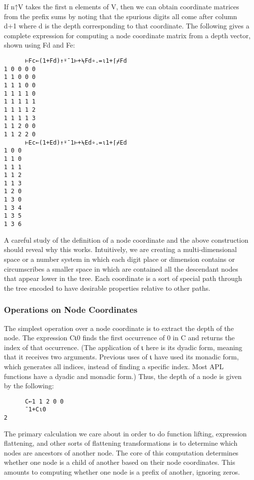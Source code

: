 \documentclass[pldi]{sigplanconf-pldi15}
\begin{document}
If n↑V takes the first n elements of V, then we can obtain coordinate matrices from the 
prefix sums by noting that the spurious digits all come after column d+1 where d is the 
depth corresponding to that coordinate. The following gives a complete expression for 
computing a node coordinate matrix from a depth vector, shown using Fd and Fe:

\begin{verbatim}
      ⊢Fc←(1+Fd)↑⍤¯1⊢+⍀Fd∘.=⍳1+⌈⌿Fd
1 0 0 0 0
1 1 0 0 0
1 1 1 0 0
1 1 1 1 0
1 1 1 1 1
1 1 1 1 2
1 1 1 1 3
1 1 2 0 0
1 1 2 2 0
      ⊢Ec←(1+Ed)↑⍤¯1⊢+⍀Ed∘.=⍳1+⌈⌿Ed
1 0 0
1 1 0
1 1 1
1 1 2
1 1 3
1 2 0
1 3 0
1 3 4
1 3 5
1 3 6
\end{verbatim}

A careful study of the definition of a node coordinate and the above construction should 
reveal why this works. Intuitively, we are creating a multi-dimensional space or a number 
system in which each digit place or dimension contains or circumscribes a smaller space in 
which are contained all the descendant nodes that appear lower in the tree. Each coordinate 
is a sort of special path through the tree encoded to have desirable properties relative to 
other paths.
\subsubsection{Operations on Node Coordinates}

The simplest operation over a node coordinate is to extract the depth of the node. The 
expression C⍳0 finds the first occurrence of 0 in C and returns the index of that 
occurrence. (The application of ⍳ here is its dyadic form, meaning that it receives two 
arguments. Previous uses of ⍳ have used its monadic form, which generates all indices, 
instead of finding a specific index. Most APL functions have a dyadic and monadic form.) 
Thus, the depth of a node is given by the following:

\begin{verbatim}
      C←1 1 2 0 0
      ¯1+C⍳0
2
\end{verbatim}

The primary calculation we care about in order to do function lifting, expression flattening, 
and other sorts of flattening transformations is to determine which nodes are ancestors of 
another node. The core of this computation determines whether one node is a child of another 
based on their node coordinates. This amounts to computing whether one node is a prefix of 
another, ignoring zeros.
\end{document}
